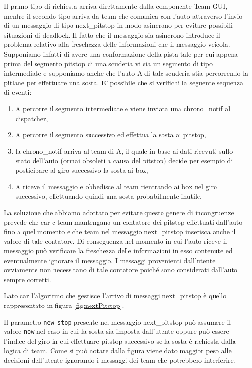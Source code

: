 \documentclass[11pt,a4paper]{report}
\newcommand{\fun}[1]{\texttt{#1}}
\begin{document}
Il primo tipo di richiesta arriva direttamente dalla componente Team GUI, mentre il secondo tipo arriva da team che comunica con l'auto attraverso l'invio di un messaggio di tipo next\_pitstop in modo asincrono per evitare possibili situazioni di deadlock. Il fatto che il messaggio sia asincrono introduce il problema relativo alla freschezza delle informazioni che il messaggio veicola. Supponiamo infatti di avere una conformazione della pista tale per cui appena prima del segmento pitstop di una scuderia vi sia un segmento di tipo intermediate e supponiamo anche che l'auto A di tale scuderia stia percorrendo la pitlane per effettuare una sosta.
E' possibile che si verifichi la seguente sequenza di eventi:
\begin{enumerate}
\item A percorre il segmento intermediate e viene inviata una chrono\_notif al dispatcher,
\item A percorre il segmento successivo ed effettua la sosta ai pitstop,
\item la chrono\_notif arriva al team di A, il quale in base ai dati ricevuti sullo stato dell'auto (ormai obsoleti a causa del pitstop) decide per esempio di posticipare al giro successivo la sosta ai box,
\item A riceve il messaggio e obbedisce al team rientrando ai box nel giro successivo, effettuando quindi una sosta probabilmente inutile.
\end{enumerate}

La soluzione che abbiamo adottato per evitare questo genere di incongruenze prevede che car e team mantengano un contatore dei pitstop effettuati dall'auto fino a quel momento e che team nel messaggio next\_pitstop inserisca anche il valore di tale contatore. Di conseguenza nel momento in cui l'auto riceve il messaggio può verificare la freschezza delle informazioni in esso contenute ed eventualmente ignorare il messaggio. I messaggi provenienti dall'utente ovviamente non necessitano di tale contatore poiché sono considerati dall'auto sempre corretti.

Lato car l'algoritmo che gestisce l'arrivo di messaggi next\_pitstop è quello rappresentato in figura \ref{fig:nextPitstop}.

Il parametro \fun{new\_stop} presente nel messaggio next\_pitstop può assumere il valore \fun{now} nel caso in cui la sosta sia imposta dall'utente oppure può essere l'indice del giro in cui effettuare pitstop successivo se la sosta è richiesta dalla logica di team. Come si può notare dalla figura viene dato maggior peso alle decisioni dell'utente ignorando i messaggi dei team che potrebbero interferire.
\end{document}
